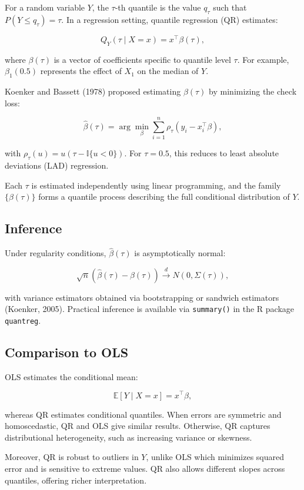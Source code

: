 \documentclass[fleqn,10pt]{latex/stylish_article} %
\begin{document}
For a random variable \(Y\), the \(\tau\)-th quantile is the value \(q_\tau\) such that \(P(Y \le q_\tau) = \tau\). In a regression setting, quantile regression (QR) estimates:

\[
Q_Y(\tau \mid X = x) = x^\top \beta(\tau),
\]

where \(\beta(\tau)\) is a vector of coefficients specific to quantile level \(\tau\). For example, \(\beta_1(0.5)\) represents the effect of \(X_1\) on the median of \(Y\).

Koenker and Bassett (1978) proposed estimating \(\beta(\tau)\) by minimizing the check loss:

\[
\hat\beta(\tau) = \arg\min_\beta \sum_{i=1}^n \rho_\tau(y_i - x_i^\top \beta),
\]

with \(\rho_\tau(u) = u(\tau - \mathbb{I}\{u < 0\})\). For \(\tau = 0.5\), this reduces to least absolute deviations (LAD) regression.

Each \(\tau\) is estimated independently using linear programming, and the family \(\{\beta(\tau)\}\) forms a quantile process describing the full conditional distribution of \(Y\).

\subsection{Inference}\label{inference}

Under regularity conditions, \(\hat\beta(\tau)\) is asymptotically normal:

\[
\sqrt{n}(\hat\beta(\tau) - \beta(\tau)) \overset{d}{\to} N(0, \Sigma(\tau)),
\]

with variance estimators obtained via bootstrapping or sandwich estimators (Koenker, 2005). Practical inference is available via \texttt{summary()} in the R package \texttt{quantreg}.

\subsection{Comparison to OLS}\label{comparison-to-ols}

OLS estimates the conditional mean:

\[
\mathbb{E}[Y \mid X = x] = x^\top \beta,
\]

whereas QR estimates conditional quantiles. When errors are symmetric and homoscedastic, QR and OLS give similar results. Otherwise, QR captures distributional heterogeneity, such as increasing variance or skewness.

Moreover, QR is robust to outliers in \(Y\), unlike OLS which minimizes squared error and is sensitive to extreme values. QR also allows different slopes across quantiles, offering richer interpretation.
\end{document}
